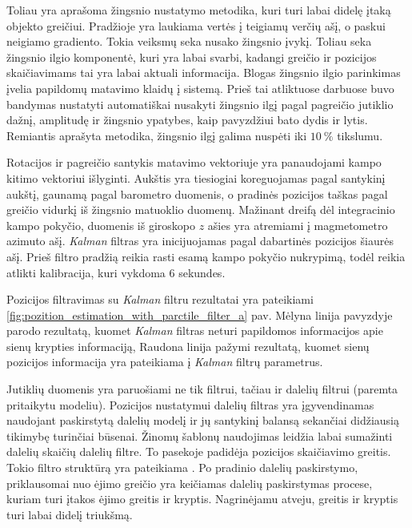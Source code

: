Toliau yra aprašoma žingsnio nustatymo metodika, kuri turi labai didelę įtaką objekto greičiui. Pradžioje yra laukiama vertės į teigiamų verčių ašį, o paskui neigiamo gradiento. Tokia veiksmų seka nusako žingsnio įvykį. Toliau seka žingsnio ilgio komponentė, kuri yra labai svarbi, kadangi greičio ir pozicijos skaičiavimams tai yra labai aktuali informacija. Blogas žingsnio ilgio parinkimas įvelia papildomų matavimo klaidų į sistemą. Prieš tai atliktuose darbuose \cite{kim2004step, goyal2011strap} buvo bandymas nustatyti automatiškai nusakyti žingsnio ilgį pagal pagreičio jutiklio dažnį, amplitudę ir žingsnio ypatybes, kaip pavyzdžiui bato dydis ir lytis. Remiantis aprašyta metodika, žingsnio ilgį galima nuspėti iki $10~\%$ tikslumu.

Rotacijos ir pagreičio santykis matavimo vektoriuje yra panaudojami kampo kitimo vektoriui išlyginti. Aukštis yra tiesiogiai koreguojamas pagal santykinį aukštį, gaunamą pagal barometro duomenis, o pradinės pozicijos taškas pagal greičio vidurkį iš žingsnio matuoklio duomenų. Mažinant dreifą dėl integracinio kampo pokyčio, duomenis iš giroskopo $z$ ašies yra atremiami į magmetometro azimuto ašį. \textit{Kalman} filtras yra inicijuojamas pagal dabartinės pozicijos šiaurės ašį. Prieš filtro pradžią reikia rasti esamą kampo pokyčio nukrypimą, todėl reikia atlikti kalibracija, kuri vykdoma 6 sekundes.

Pozicijos filtravimas su \textit{Kalman} filtru rezultatai yra pateikiami \ref{fig:pozition_estimation_with_parctile_filter_a} pav. Mėlyna linija pavyzdyje parodo rezultatą, kuomet \textit{Kalman} filtras neturi papildomos informacijos apie sienų krypties informaciją, Raudona linija pažymi rezultatą, kuomet sienų pozicijos informacija yra pateikiama į \textit{Kalman} filtrų parametrus.

Jutiklių duomenis yra paruošiami ne tik  filtrui, tačiau ir dalelių filtrui (paremta \cite{davidson2010application, pinchin2012particle} pritaikytu modeliu). Pozicijos nustatymui dalelių filtras yra įgyvendinamas naudojant paskirstytą dalelių modelį ir jų santykinį balansą sekančiai didžiausią tikimybę turinčiai būsenai. Žinomų šablonų naudojimas leidžia labai sumažinti dalelių skaičių dalelių filtre. To pasekoje padidėja pozicijos skaičiavimo greitis. Tokio filtro struktūrą yra pateikiama \cite{willemsen2013kalibrierung}. Po pradinio dalelių paskirstymo, priklausomai nuo ėjimo greičio yra keičiamas dalelių paskirstymas procese, kuriam turi įtakos ėjimo greitis ir kryptis. Nagrinėjamu atveju, greitis ir kryptis turi labai didelį triukšmą.

